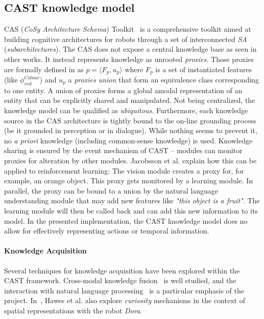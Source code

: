 \documentclass[journal]{IEEEtran}
\begin{document}
\subsection{CAST knowledge model}
\label{sect|cast}

CAS (\emph{CoSy Architecture Schema}) Toolkit~\cite{Hawes2007} is a
comprehensive toolkit aimed at building cognitive architectures for robots
through a set of interconnected \emph{SA} (\emph{subarchitectures}). The CAS
does not expose a central knowledge base as seen in other works. It instead 
represents knowledge as unrooted \emph{proxies}. Those proxies are formally
defined in \cite{jacobsson2008crossmodal} as $p= \langle F_p, u_p \rangle$ where $F_p$ is
a set of instantiated features (like $\phi^{Colour}_{red}$) and $u_p$ a
\emph{proxies union} that form an equivalence class corresponding to one
entity.
% 
A union of proxies forms a global amodal representation of an entity that can
be explicitly shared and manipulated. Not being centralized, the knowledge
model can be qualified as \emph{ubiquitous}. Furthermore, each knowledge source 
in the CAS architecture is tightly bound to the on-line grounding process (be it
grounded in perception or in dialogue). While nothing seems to prevent it, no
{\it a priori} knowledge (including common-sense knowledge) is used.
% 
Knowledge sharing is ensured by the event mechanism of CAST -- modules can
monitor proxies for alteration by other modules. Jacobsson et al. explain how
this can be applied to reinforcement learning: The vision module creates a 
proxy for, for example, an orange object. This proxy gets monitored by a 
learning module. In parallel, the proxy can be bound to a union by the natural 
language understanding module that may add new features like \emph{"this object 
is a fruit"}. The learning module will then be called back and can add this 
new information to its model.
% 
In the presented implementation, the CAST knowledge model does no allow for
effectively representing actions or temporal information.

\paragraph{Knowledge Acquisition} Several techniques for knowledge acquisition
have been explored within the CAST framework. Cross-modal knowledge
fusion~\cite{Hawes2007a} is well studied, and the interaction with natural
language processing~\cite{Kruijff2010, Kruijff2010a} is a particular emphasis
of the project.
% 
In~\cite{Hawes2011}, Hawes et al. also explore \emph{curiosity} mechanisms in
the context of spatial representations with the robot \emph{Dora}.
% 
\end{document}
